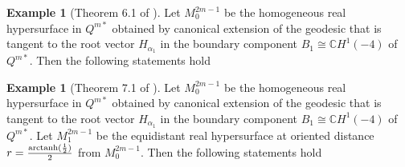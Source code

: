 \documentclass[reqno]{amsart}%
\theoremstyle{definition}
\newtheorem{example}[theorem]{Example}
\numberwithin{equation}{section}
\begin{document}
\begin{example}[Theorem 6.1 of \cite{B-2023}]\label{ex:3.6}
Let $M^{2m-1}_0$ be the homogeneous real hypersurface in $Q^{m*}$ obtained by
canonical extension of the geodesic that is tangent to the root vector $H_{\alpha_1}$ in the boundary
component $B_1\cong \mathbb{C}H^1(-4)$ of $Q^{m*}$. Then the following statements hold
%
\end{example}

\begin{example}[Theorem 7.1 of \cite{B-2023}]\label{ex:3.7}
Let $M^{2m-1}_0$ be the homogeneous real hypersurface in $Q^{m*}$ obtained by
canonical extension of the geodesic that is tangent to the root vector $H_{\alpha_1}$ in the boundary
component $B_1\cong \mathbb{C}H^1(-4)$ of $Q^{m*}$.
Let $M^{2m-1}_1$ be the equidistant real hypersurface at oriented distance $r=\frac{{\rm arctanh}(\frac{1}{2})}{2}$ from
$M^{2m-1}_0$. Then the following statements hold
%
\end{example}
\end{document}

